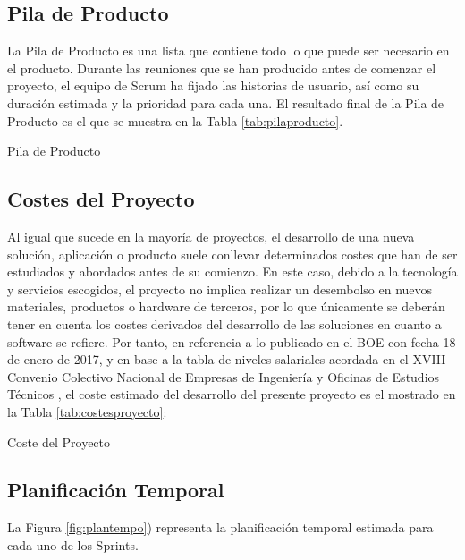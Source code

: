 \subsection{Pila de Producto}
La Pila de Producto es una lista que contiene todo lo que puede ser necesario en el producto. Durante las reuniones que se han producido antes de comenzar el proyecto, el equipo de Scrum ha fijado las historias de usuario, así como su duración estimada y la prioridad para cada una. El resultado final de la Pila de Producto es el que se muestra en la Tabla \ref{tab:pilaproducto}.

\begin{table}[!htbp]
	\centering
	{\small
		
	}
	\caption[Pila de Producto]
	{Pila de Producto}
	\label{tab:pilaproducto}
\end{table}

\clearpage

\subsection{Costes del Proyecto}
Al igual que sucede en la mayoría de proyectos, el desarrollo de una nueva solución, aplicación o producto suele conllevar determinados costes que han de ser estudiados y abordados antes de su comienzo. En este caso, debido a la tecnología y servicios escogidos, el proyecto no implica realizar un desembolso en nuevos materiales, productos o hardware de terceros, por lo que únicamente se deberán tener en cuenta los costes derivados del desarrollo de las soluciones en cuanto a software se refiere. Por tanto, en referencia a lo publicado en el \acf{BOE} con fecha 18 de enero de 2017, y en base a la tabla de niveles salariales acordada en el XVIII Convenio Colectivo Nacional de Empresas de Ingeniería y Oficinas de Estudios Técnicos \cite{BOE2017}, el coste estimado del desarrollo del presente proyecto es el mostrado en la Tabla \ref{tab:costesproyecto}:

\begin{table}[!htbp]
	\centering
	{\small
		
	}
	\caption[Coste del Proyecto]
	{Coste del Proyecto}
	\label{tab:costesproyecto}
\end{table}

\subsection{Planificación Temporal}
La Figura \ref{fig:plantempo}) representa la planificación temporal estimada para cada uno de los Sprints.

